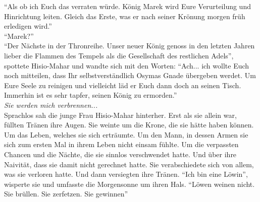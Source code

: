 ``Als ob ich Euch das verraten würde. König Marek wird Eure Verurteilung und Hinrichtung leiten. 
Gleich das Erste, was er nach seiner Krönung morgen früh erledigen wird.''\\
``Marek?''\\
``Der Nächste in der Thronreihe. Unser neuer König genoss in den letzten Jahren lieber die Flammen 
des Tempels als die Gesellschaft des restlichen Adels'', spottete Hisio-Mahar und wandte sich mit 
den Worten: ``Ach... ich wollte Euch noch mitteilen, dass Ihr selbstverständlich Osymas Gnade 
übergeben werdet. Um Eure Seele zu reinigen und vielleicht läd er Euch dann doch an seinen Tisch. 
Immerhin ist es sehr tapfer, seinen König zu ermorden.''\\
\textit{Sie werden mich verbrennen...}\\
Sprachlos sah die junge Frau Hisio-Mahar hinterher. Erst als sie allein war, füllten Tränen ihre 
Augen. Sie weinte um die Krone, die sie hätte haben können. Um das Leben, welches sie sich 
erträumte. Um den Mann, in dessen Armen sie sich zum ersten Mal in ihrem Leben nicht einsam fühlte. 
Um die verpassten Chancen und die Nächte, die sie sinnlos verschwendet hatte. Und über ihre 
Naivität, dass sie damit nicht gerechnet hatte. Sie verabschiedete sich von allem, was sie verloren 
hatte. Und dann versiegten ihre Tränen. ``Ich bin eine Löwin'', wisperte sie und umfasste die 
Morgensonne um ihren Hals. ``Löwen weinen nicht. Sie brüllen. Sie zerfetzen. Sie gewinnen''\\


